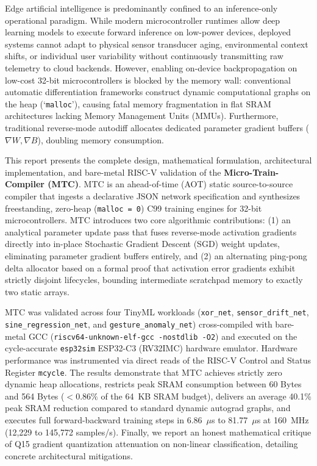 \documentclass[12pt,a4paper]{report}
\begin{document}
Edge artificial intelligence is predominantly confined to an inference-only operational paradigm. While modern microcontroller runtimes allow deep learning models to execute forward inference on low-power devices, deployed systems cannot adapt to physical sensor transducer aging, environmental context shifts, or individual user variability without continuously transmitting raw telemetry to cloud backends. However, enabling on-device backpropagation on low-cost 32-bit microcontrollers is blocked by the memory wall: conventional automatic differentiation frameworks construct dynamic computational graphs on the heap (`\texttt{malloc}'), causing fatal memory fragmentation in flat SRAM architectures lacking Memory Management Units (MMUs). Furthermore, traditional reverse-mode autodiff allocates dedicated parameter gradient buffers ($\nabla W, \nabla B$), doubling memory consumption.

This report presents the complete design, mathematical formulation, architectural implementation, and bare-metal RISC-V validation of the \textbf{Micro-Train-Compiler (MTC)}. MTC is an ahead-of-time (AOT) static source-to-source compiler that ingests a declarative JSON network specification and synthesizes freestanding, zero-heap (\texttt{malloc = 0}) C99 training engines for 32-bit microcontrollers. MTC introduces two core algorithmic contributions: (1) an analytical parameter update pass that fuses reverse-mode activation gradients directly into in-place Stochastic Gradient Descent (SGD) weight updates, eliminating parameter gradient buffers entirely, and (2) an alternating ping-pong delta allocator based on a formal proof that activation error gradients exhibit strictly disjoint lifecycles, bounding intermediate scratchpad memory to exactly two static arrays.

MTC was validated across four TinyML workloads (\texttt{xor\_net}, \texttt{sensor\_drift\_net}, \texttt{sine\_regression\_net}, and \texttt{gesture\_anomaly\_net}) cross-compiled with bare-metal GCC (\texttt{riscv64-unknown-elf-gcc -nostdlib -O2}) and executed on the cycle-accurate \texttt{esp32sim} ESP32-C3 (RV32IMC) hardware emulator. Hardware performance was instrumented via direct reads of the RISC-V Control and Status Register \texttt{mcycle}. The results demonstrate that MTC achieves strictly zero dynamic heap allocations, restricts peak SRAM consumption between 60 Bytes and 564 Bytes ($< 0.86\%$ of the 64~KB SRAM budget), delivers an average 40.1\% peak SRAM reduction compared to standard dynamic autograd graphs, and executes full forward-backward training steps in 6.86~$\mu$s to 81.77~$\mu$s at 160~MHz (12,229 to 145,772 samples/s). Finally, we report an honest mathematical critique of Q15 gradient quantization attenuation on non-linear classification, detailing concrete architectural mitigations.
\end{document}
